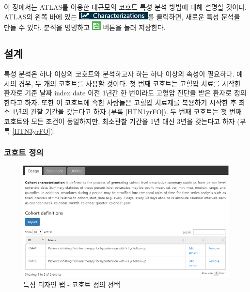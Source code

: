 \documentclass[11pt]{book}
\theoremstyle{definition}
\theoremstyle{definition}
\theoremstyle{definition}
\theoremstyle{remark}
\begin{document}
이 장에서는 ATLAS를 이용한 대규모의 코호트 특성 분석 방법에 대해 설명할
것이다. ATLAS의 왼쪽 바에 있는
\includegraphics{images/Characterization/atlasCharacterizationMenuItem.png}를
클릭하면, 새로운 특성 분석을 만들 수 있다. 분석을 명명하고
\includegraphics{images/PopulationLevelEstimation/save.png} 버튼을 눌러
저장한다.

\subsection{설계}

특성 분석은 하나 이상의 코호트와 분석하고자 하는 하나 이상의 속성이
필요하다. 예시의 경우, 두 개의 코호트를 사용할 것이다. 첫 번째 코호트는
고혈압 치료를 시작한 환자로 기준 날짜 index date 이전 1년간 한 번이라도
고혈압 진단을 받은 환자로 정의한다고 하자. 또한 이 코호트에 속한
사람들은 고혈압 치료제를 복용하기 시작한 후 최소 1년의 관찰 기간을
갖는다고 하자 (부록 \ref{HTN1yrFO}). 두 번째 코호트는 첫 번째 코호트와
모든 조건이 동일하지만, 최소관찰 기간을 1년 대신 3년을 갖는다고 하자
(부록 \ref{HTN3yrFO}).

\subsubsection*{코호트 정의}\label{-}

\begin{figure}

{\centering \includegraphics[width=1\linewidth]{images/Characterization/atlasCharacterizationCohortSelection} 

}

\caption{특성 디자인 탭 - 코호트 정의 선택}\label{fig:atlasCharacterizationCohortSelection}
\end{figure}
\end{document}
